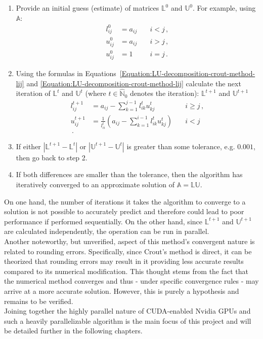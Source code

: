 \begin{enumerate}
	\item Provide an initial guess (estimate) of matrices $ \mathbb{L}^0 $ and $ \mathbb{U}^0 $. For example, using $ \mathbb{A} $:
		\begin{align}
			l_{ij}^{0} &= a_{ij} \quad &i < j \nonumber\,, \\
			u_{ij}^{0} &= a_{ij} \quad &i > j \nonumber\,, \\
			u_{ij}^{0} &= 1 \quad      &i = j \nonumber\,.
		\end{align}
	\item Using the formulas in Equations~\ref{Equation:LU-decomposition-crout-method-lij} and \ref{Equation:LU-decomposition-crout-method-lij} calculate the next iteration of $ \mathbb{L}^{t} $ and $ \mathbb{U}^{t} $ (where $ t \in \widehat{\mathbb{N}}_0 $ denotes the iteration): $ \mathbb{L}^{t+1} $ and $ \mathbb{U}^{t+1} $
		\begin{align}
			l_{ij}^{t+1} &= a_{ij} - \sum_{k=1}^{j-1}l_{ik}^{t}u_{kj}^{t} 								   &\quad i \geq j \nonumber\,, \\
			u_{ij}^{t+1} &= \frac{1}{l_{ii}^{t}} \left ( a_{ij} - \sum_{k=1}^{i-1}l_{ik}^{t}u_{kj}^{t} \right ) &\quad i < j \\ \nonumber\,.
		\end{align}
	\item If either $ \left | \mathbb{L}^{t+1} - \mathbb{L}^{t} \right | $ or $ \left | \mathbb{U}^{t+1} - \mathbb{U}^{t} \right | $ is greater than some tolerance, e.g. $ 0.001 $, then go back to step 2.
	\item If both differences are smaller than the tolerance, then the algorithm has iteratively converged to an approximate solution of $ \mathbb{A} = \mathbb{LU} $.
\end{enumerate}

On one hand, the number of iterations it takes the algorithm to converge to a solution is not possible to accurately predict and therefore could lead to poor performance if performed sequentially. On the other hand, since $ \mathbb{L}^{t+1} $ and $ \mathbb{U}^{t+1} $ are calculated independently, the operation can be run in parallel. \\
Another noteworthy, but unverified, aspect of this method's convergent nature is related to rounding errors. Specifically, since Crout's method is direct, it can be theorized that rounding errors may result in it providing less accurate results compared to its numerical modification. This thought stems from the fact that the numerical method converges and thus - under specific convergence rules - may arrive at a more accurate solution. However, this is purely a hypothesis and remains to be verified. \\
Joining together the highly parallel nature of CUDA-enabled Nvidia GPUs and such a heavily parallelizable algorithm is the main focus of this project and will be detailed further in the following chapters.
